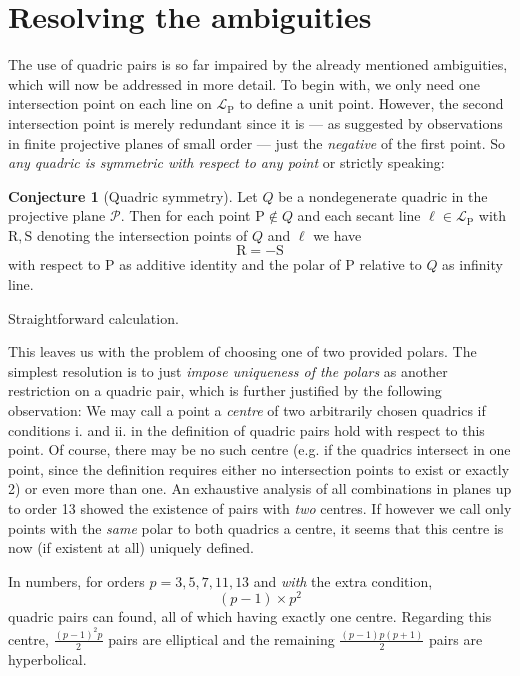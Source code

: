 \documentclass[12pt,english,paper=a4,DIV=12,headings=small,numbers=noenddot,parskip=half]{scrartcl}
\theoremstyle{definition}
\newtheorem{conj}{Conjecture}
\renewenvironment{proof}{{\itshape Idea of proof.}}{}
\begin{document}
\section{Resolving the ambiguities}
The use of quadric pairs is so far impaired by the already mentioned ambiguities, which will now be addressed in more detail. To begin with, we only need one intersection point on each line on $\mathscr{L}_\mathrm{P}$ to define a unit point. However, the second intersection point is merely redundant since it is --- as suggested by observations in finite projective planes of small order --- just the \emph{negative} of the first point. So \emph{any quadric is symmetric with respect to any point} or strictly speaking:

\begin{conj}[Quadric symmetry]
Let $Q$ be a nondegenerate quadric in the projective plane $\mathscr{P}$. Then for each point $\mathrm{P}\notin Q$ and each secant line $\ell\in\mathscr{L}_\mathrm{P}$ with $\mathrm{R}, \mathrm{S}$ denoting the intersection points of $Q$ and $\ell$ we have
\begin{equation*}
\mathrm{R} = -\mathrm{S}
\end{equation*}
with respect to $\mathrm{P}$ as additive identity and the polar of $\mathrm{P}$ relative to $Q$ as infinity line.

\begin{proof}
Straightforward calculation.
\end{proof}
\end{conj}

This leaves us with the problem of choosing one of two provided polars. The simplest resolution is to just \emph{impose uniqueness of the polars} as another restriction on a quadric pair, which is further justified by the following observation: We may call a point a \emph{centre} of two arbitrarily chosen quadrics if conditions i. and ii. in the definition of quadric pairs hold with respect to this point. Of course, there may be no such centre (e.g. if the quadrics intersect in one point, since the definition requires either no intersection points to exist or exactly 2) or even more than one. An exhaustive analysis of all combinations in planes up to order 13 showed the existence of pairs with \emph{two} centres. If however we call only points with the \emph{same} polar to both quadrics a centre, it seems that this centre is now (if existent at all) uniquely defined.

In numbers, for orders $p=3,5,7,11,13$ and \emph{with} the extra condition,
\begin{equation*}
(p-1)\times p^2
\end{equation*}
quadric pairs can found, all of which having exactly one centre. Regarding this centre, $\frac{(p-1)^2p}{2}$ pairs are elliptical and the remaining $\frac{(p-1)p(p+1)}{2}$ pairs are hyperbolical.
\end{document}
